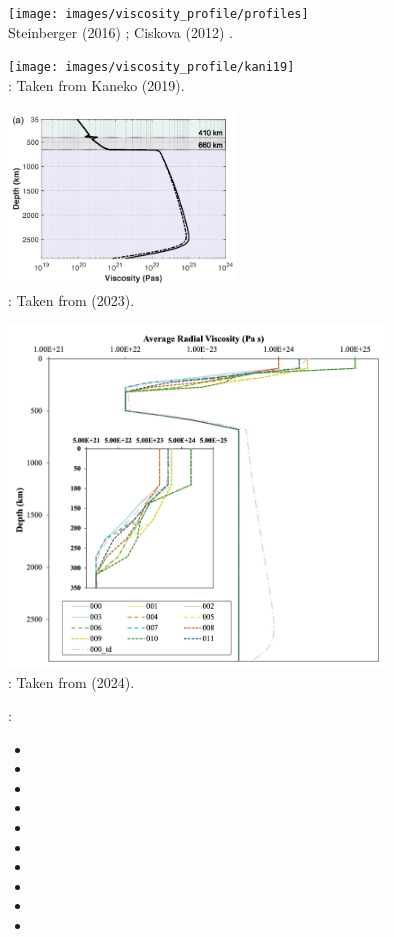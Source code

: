 \begin{center}
\texttt{[image: images/viscosity\_profile/profiles]}\\
{\captionfont Steinberger (2016) \cite{stei16}; 
Ciskova \etal (2012) \cite{civs12}.}
\end{center}

\begin{center}
\texttt{[image: images/viscosity\_profile/kani19]}\\
{\captionfont \twothousandnineteen: Taken from Kaneko \etal \cite{kani19} (2019).}
\end{center}

\begin{center}
\includegraphics[width=6cm]{images/viscosity_profile/nemi23}\\
{\captionfont \twothousandtwentythree: Taken from \textcite{nemi23} (2023).}
\end{center}

\begin{center}
\includegraphics[width=10cm]{images/viscosity_profile/pldp24}\\
{\captionfont \twothousandtwentyfour: Taken from \textcite{pldp24} (2024).}
\end{center}



\Literature:
\begin{itemize} 
\item {}
\item {}
\item {}
\item {}
\item {}
\item {}
\item {}
\item {}
\item {}
\item {}
\end{itemize} 
